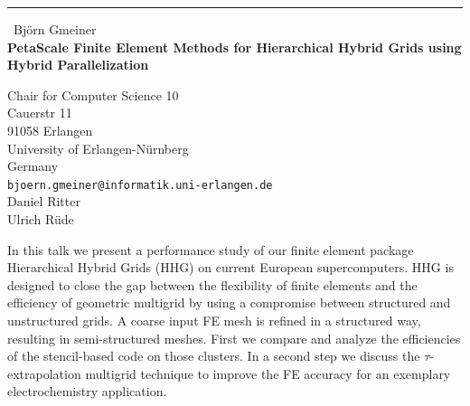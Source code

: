 \documentclass{report}
\begin{document}
\begin{center}
\rule{6in}{1pt} \
{\large Bj\"orn Gmeiner \\
{\bf PetaScale Finite Element Methods for Hierarchical Hybrid Grids using Hybrid Parallelization}}

Chair for Computer Science 10 \\ Cauerstr 11 \\ 91058 Erlangen \\ University of Erlangen-N\"urnberg \\ Germany
\\
{\tt bjoern.gmeiner@informatik.uni-erlangen.de}\\
Daniel Ritter\\
Ulrich R\"ude\end{center}

In this talk we present a performance study of our finite element package
Hierarchical Hybrid Grids (HHG) on current European supercomputers.
HHG is designed to close the gap between the flexibility of finite
elements and the efficiency of geometric multigrid by using a compromise
between structured and unstructured grids. A coarse input FE mesh is
refined in a structured way, resulting in semi-structured meshes. First
we compare and analyze the efficiencies of the stencil-based code on
those clusters. In a second step we discuss the $\tau$-extrapolation
multigrid technique to improve the FE accuracy for an exemplary
electrochemistry application.
\end{document}
